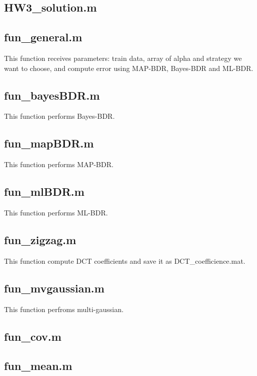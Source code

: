 \documentclass[12pt,letterpaper]{article}
\begin{document}
    \subsection{HW3\_solution.m}
    \lstset{style=mystyle}
    

    \subsection{fun\_general.m}
    This function receives parameters: train data, array of alpha and strategy we want to choose,
    and compute error using MAP-BDR, Bayes-BDR and ML-BDR.
    \lstset{style=mystyle}
    

    \subsection{fun\_bayesBDR.m}
    This function performs Bayes-BDR.
    \lstset{style=mystyle}
    

    \subsection{fun\_mapBDR.m}
    This function performs MAP-BDR.
    \lstset{style=mystyle}
    

    \subsection{fun\_mlBDR.m}
    This function performs ML-BDR.
    \lstset{style=mystyle}
    

    \subsection{fun\_zigzag.m}
    This function compute DCT coefficients and save it as DCT\_coefficience.mat.
    \lstset{style=mystyle}
    

    \subsection{fun\_mvgaussian.m}
    This function perfroms multi-gaussian.
    \lstset{style=mystyle}
    

    \subsection{fun\_cov.m}
    \lstset{style=mystyle}
    

    \subsection{fun\_mean.m}
    \lstset{style=mystyle}
    

    
\end{document}
